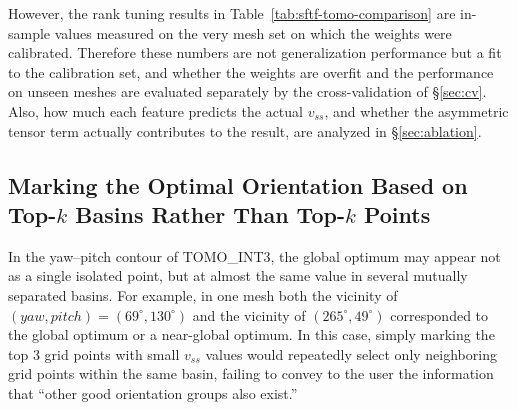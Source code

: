 \documentclass[11pt,a4paper]{article}
\begin{document}
However, the rank tuning results in Table~\ref{tab:sftf-tomo-comparison} are in-sample values measured on the very mesh set on which the weights were calibrated.
Therefore these numbers are not generalization performance but a fit to the calibration set,
and whether the weights are overfit and the performance on unseen meshes are evaluated separately by the cross-validation of \S\ref{sec:cv}.
Also, how much each feature predicts the actual $v_{ss}$, and whether the asymmetric tensor term actually contributes to the result, are analyzed in \S\ref{sec:ablation}.

\subsection{Marking the Optimal Orientation Based on Top-$k$ Basins Rather Than Top-$k$ Points}

In the yaw--pitch contour of TOMO\_INT3, the global optimum may appear not as a single isolated point, but
at almost the same value in several mutually separated basins.
For example, in one mesh both the vicinity of $(yaw,pitch)=(69^\circ,130^\circ)$ and
the vicinity of $(265^\circ,49^\circ)$ corresponded to the global optimum or a near-global optimum.
In this case, simply marking the top 3 grid points with small $v_{ss}$ values
would repeatedly select only neighboring grid points within the same basin,
failing to convey to the user the information that ``other good orientation groups also exist.''
\end{document}
